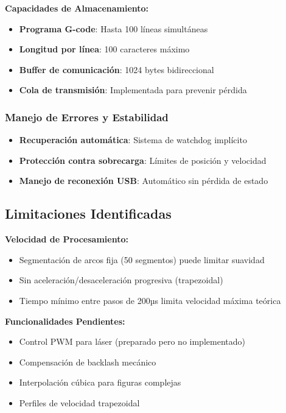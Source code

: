 \documentclass[12pt]{article}
\begin{document}
\newpage
\textbf{Capacidades de Almacenamiento:}
\begin{itemize}
    \item \textbf{Programa G-code}: Hasta 100 líneas simultáneas
    \item \textbf{Longitud por línea}: 100 caracteres máximo
    \item \textbf{Buffer de comunicación}: 1024 bytes bidireccional
    \item \textbf{Cola de transmisión}: Implementada para prevenir pérdida
\end{itemize}

\subsubsection{Manejo de Errores y Estabilidad}
\begin{itemize}
    \item \textbf{Recuperación automática}: Sistema de watchdog implícito
    \item \textbf{Protección contra sobrecarga}: Límites de posición y velocidad
    \item \textbf{Manejo de reconexión USB}: Automático sin pérdida de estado

\end{itemize}


\subsection{Limitaciones Identificadas}

\textbf{Velocidad de Procesamiento:}
\begin{itemize}
    \item Segmentación de arcos fija (50 segmentos) puede limitar suavidad
    \item Sin aceleración/desaceleración progresiva (trapezoidal)
    \item Tiempo mínimo entre pasos de 200µs limita velocidad máxima teórica
\end{itemize}

\textbf{Funcionalidades Pendientes:}
\begin{itemize}
    \item Control PWM para láser (preparado pero no implementado)
    \item Compensación de backlash mecánico
    \item Interpolación cúbica para figuras complejas
    \item Perfiles de velocidad trapezoidal
\end{itemize}
\end{document}
